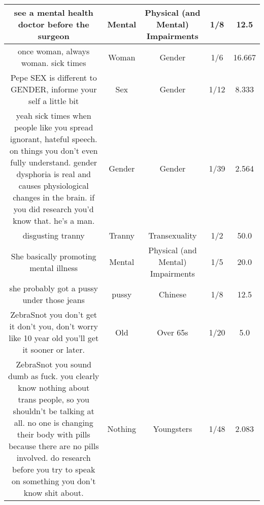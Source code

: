 \documentclass[11pt]{article}
\newlength\mylength
\begin{document}
\begin{center}
\begin{longtable}{|C{.40\mylength}|C{.30\mylength}|C{.15\mylength}|C{.15\mylength}|C{.15\mylength}|}
  see a mental health doctor before the surgeon  & Mental & Physical (and Mental) Impairments & 1/8 & 12.5 \\  \hline
  once woman, always woman. sick times  & Woman & Gender & 1/6 & 16.667 \\  \hline
  Pepe SEX is different to GENDER, informe your self a little bit  & Sex & Gender & 1/12 & 8.333 \\  \hline
  yeah sick times when people like you spread ignorant, hateful speech. on things you don't even fully understand. gender dysphoria is real and causes physiological changes in the brain. if you did research you'd know that. he's a man.  & Gender & Gender & 1/39 & 2.564 \\  \hline
  disgusting tranny  & Tranny & Transexuality & 1/2 & 50.0 \\  \hline
  She basically promoting mental illness  & Mental & Physical (and Mental) Impairments & 1/5 & 20.0 \\  \hline
  she probably got a pussy under those jeans  & pussy & Chinese & 1/8 & 12.5 \\  \hline
   ZebraSnot you don't get it don't you, don't worry like 10 year old you'll get it sooner or later.     & Old & Over 65s & 1/20 & 5.0 \\  \hline
  ZebraSnot you sound dumb as fuck. you clearly know nothing about trans people, so you shouldn't be talking at all. no one is changing their body with pills because there are no pills involved. do research before you try to speak on something you don't know shit about.  & Nothing & Youngsters & 1/48 & 2.083 \\  \hline

\end{longtable}
\end{center}
\end{document}
